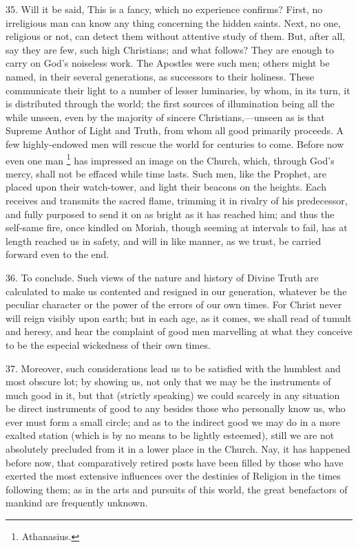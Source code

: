 35. Will it be said, This is a fancy, which no experience confirms?
First, no irreligious man can know any thing concerning the hidden
saints. Next, no one, religious or not, can detect them without
attentive study of them. But, after all, say they are few, such high
Christians; and what follows? They are enough to carry on God's
noiseless work. The Apostles were such men; others might be named, in
their several generations, as successors to their holiness. These
communicate their light to a number of lesser luminaries, by whom, in
its turn, it is distributed through the world; the first sources of
illumination being all the while unseen, even by the majority of
sincere Christians,—unseen as is that Supreme Author of Light and
Truth, from whom all good primarily proceeds. A few highly-endowed men
will rescue the world for centuries to come. Before now even one man \footnote{Athanasius.} has impressed an image on the Church, which, through God's
mercy, shall not be effaced while time lasts. Such men, like the
Prophet, are placed upon their watch-tower, and light their beacons on
the heights. Each receives and transmits the sacred flame, trimming it
in rivalry of his predecessor, and fully purposed to send it on as
bright as it has reached him; and thus the self-same fire, once
kindled on Moriah, though seeming at intervals to fail, has at length
reached us in safety, and will in like manner, as we trust, be carried
forward even to the end.

36. To conclude. Such views of the nature and history of Divine
Truth are calculated to make us contented and resigned in our
generation, whatever be the peculiar character or the power of the
errors of our own times. For Christ never will reign visibly upon
earth; but in each age, as it comes, we shall read of tumult and
heresy, and hear the complaint of good men marvelling at what they
conceive to be the especial wickedness of their own times.

37. Moreover, such considerations lead us to be satisfied with the
humblest and most obscure lot; by showing us, not only that we may be
the instruments of much good in it, but that (strictly speaking) we
could scarcely in any situation be direct instruments of good to any
besides those who personally know us, who ever must form a small
circle; and as to the indirect good we may do in a more exalted
station (which is by no means to be lightly esteemed), still we are
not absolutely precluded from it in a lower place in the Church. Nay,
it has happened before now, that comparatively retired posts have been
filled by those who have exerted the most extensive influences over
the destinies of Religion in the times following them; as in the arts
and pursuits of this world, the great benefactors of mankind are
frequently unknown.

